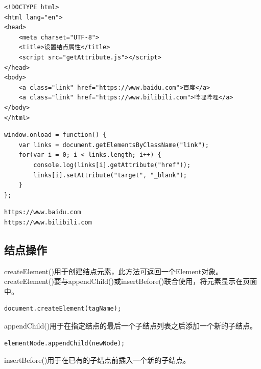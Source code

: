 \vspace{0.5cm}


\begin{lstlisting}[style=htmlcssjs, title=getAttribute.html]
<!DOCTYPE html>
<html lang="en">
<head>
    <meta charset="UTF-8">
    <title>设置结点属性</title>
    <script src="getAttribute.js"></script>
</head>
<body>
    <a class="link" href="https://www.baidu.com">百度</a>
    <a class="link" href="https://www.bilibili.com">哔哩哔哩</a>
</body>
</html>
\end{lstlisting}

\begin{lstlisting}[style=htmlcssjs, title=getAttribute.js]
window.onload = function() {
    var links = document.getElementsByClassName("link");
    for(var i = 0; i < links.length; i++) {
        console.log(links[i].getAttribute("href"));
        links[i].setAttribute("target", "_blank");
    }
};
\end{lstlisting}

\begin{tcolorbox}
	\begin{verbatim}
https://www.baidu.com
https://www.bilibili.com
	\end{verbatim}
\end{tcolorbox}

\subsection{结点操作}

createElement()用于创建结点元素，此方法可返回一个Element对象。 \\

createElement()要与appendChild()或insertBefore()联合使用，将元素显示在页面中。 \\

\begin{lstlisting}[style=htmlcssjs]
document.createElement(tagName);
\end{lstlisting}

appendChild()用于在指定结点的最后一个子结点列表之后添加一个新的子结点。 \\

\begin{lstlisting}[style=htmlcssjs]
elementNode.appendChild(newNode);
\end{lstlisting}

insertBefore()用于在已有的子结点前插入一个新的子结点。 \\

